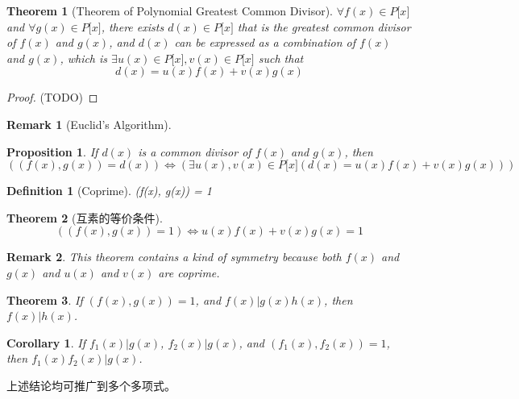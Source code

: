 \documentclass[onecolumn]{ctexart}
\newtheorem{definition}{Definition}
\newtheorem{theorem}{Theorem}
\newtheorem{proposition}{Proposition}
\newtheorem{corollary}{Corollary}
\newtheorem{remark}{Remark}
\begin{document}
\begin{theorem}[Theorem of Polynomial Greatest Common Divisor]
  $\forall f(x) \in P\lbrack x \rbrack$ and $\forall g(x) \in P\lbrack x \rbrack$, 
  there exists $d(x) \in P\lbrack x \rbrack$ that is the greatest common divisor 
  of $f(x)$ and $g(x)$, and $d(x)$ can be expressed as a combination of $f(x)$ 
  and $g(x)$, which is $\exists u(x) \in P\lbrack x \rbrack, v(x) \in P\lbrack x 
  \rbrack$ such that
  \[
    d(x) = u(x)f(x) + v(x)g(x)
  \]
\end{theorem}
\begin{proof}
  (TODO)
\end{proof}

\begin{remark}[Euclid's Algorithm]
  
\end{remark}

\begin{proposition}
  If $d(x)$ is a common divisor of $f(x)$ and $g(x)$, then
  \[
    ((f(x), g(x)) = d(x)) \Leftrightarrow (\exists u(x), v(x) \in P\lbrack x \rbrack (d(x) = u(x)f(x) + v(x)g(x)))
  \]
\end{proposition}

\begin{definition}[Coprime]
  (f(x), g(x)) = 1
\end{definition}

\begin{theorem}[互素的等价条件]
  \[
    ((f(x), g(x)) = 1) \Leftrightarrow u(x)f(x) + v(x)g(x) = 1
  \]
\end{theorem}
\begin{remark}
  This theorem contains a kind of symmetry because both $f(x)$ and $g(x)$ and $u(x)$ and $v(x)$ are coprime.
\end{remark}

\begin{theorem}
  If $(f(x), g(x)) = 1$, and $f(x) | g(x)h(x)$, then $f(x) | h(x)$.
\end{theorem}

\begin{corollary}
  If $f_1(x) | g(x)$, $f_2(x) | g(x)$, and $(f_1(x), f_2(x)) = 1$, then $f_1(x)f_2(x) | g(x)$.
\end{corollary}

上述结论均可推广到多个多项式。
\end{document}
